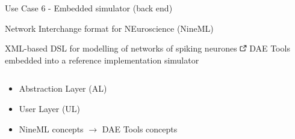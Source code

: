 \documentclass[compress,newPxFont,sthlmFooter]{beamer}
\begin{document}
\begin{frame}[plain]{Use Case 6 - Embedded simulator (back end)}
    \begin{center}
        \alert{Network Interchange format for NEuroscience (NineML)}
    \end{center}   
    \small{XML-based DSL for modelling of networks of spiking neurones 
                \href{http://software.incf.org/software/nineml}{\includegraphics[align=b, height=0.8em]{link.png}}
                } \linebreak
    \small{DAE Tools embedded into a \alert{reference implementation simulator}}
    \begin{columns}[c]
      \begin{column}{0.50\paperwidth}
        {\scriptsize
         \begin{itemize}
            \item \alert{Abstraction Layer (AL)}
            \item \alert{User Layer (UL)}
            \item NineML concepts $\rightarrow$ DAE Tools concepts
        \end{itemize}
        }
      \end{column}
      

\end{columns}
\end{frame}
\end{document}
